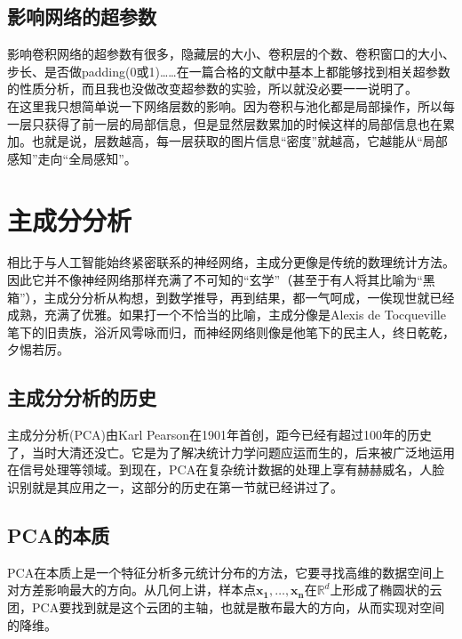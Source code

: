 \documentclass[12pt]{article}
\begin{document}
\subsection{影响网络的超参数}

影响卷积网络的超参数有很多，隐藏层的大小、卷积层的个数、卷积窗口的大小、步长、是否做padding(0或1)……在一篇合格的文献中基本上都能够找到相关超参数的性质分析，而且我也没做改变超参数的实验，所以就没必要一一说明了。\\

在这里我只想简单说一下网络层数的影响。因为卷积与池化都是局部操作，所以每一层只获得了前一层的局部信息，但是显然层数累加的时候这样的局部信息也在累加。也就是说，层数越高，每一层获取的图片信息“密度”就越高，它越能从“局部感知”走向“全局感知”。


\section{主成分分析}

相比于与人工智能始终紧密联系的神经网络，主成分更像是传统的数理统计方法。因此它并不像神经网络那样充满了不可知的“玄学”（甚至于有人将其比喻为“黑箱”），主成分分析从构想，到数学推导，再到结果，都一气呵成，一俟现世就已经成熟，充满了优雅。如果打一个不恰当的比喻，主成分像是Alexis de Tocqueville笔下的旧贵族，浴沂风雩咏而归，而神经网络则像是他笔下的民主人，终日乾乾，夕惕若厉。

\subsection{主成分分析的历史}

主成分分析(PCA)由Karl Pearson在1901年首创，距今已经有超过100年的历史了，当时大清还没亡。它是为了解决统计力学问题应运而生的，后来被广泛地运用在信号处理等领域。到现在，PCA在复杂统计数据的处理上享有赫赫威名，人脸识别就是其应用之一，这部分的历史在第一节就已经讲过了。

\subsection{PCA的本质}

PCA在本质上是一个特征分析多元统计分布的方法，它要寻找高维的数据空间上对方差影响最大的方向。从几何上讲，样本点$\mathbf{x_1}, \ldots, \mathbf{x_n}$在$\mathbb{R}^d$上形成了椭圆状的云团，PCA要找到就是这个云团的主轴，也就是散布最大的方向，从而实现对空间的降维。\\
\end{document}

